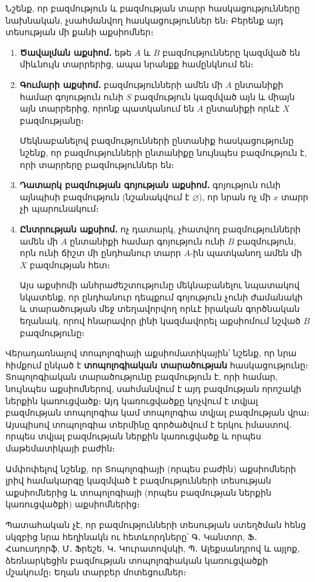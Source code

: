 \documentclass[./main.tex]{subfiles}
\begin{document}
\par Նշենք, որ բազմություն և բազմության տարր հասկացությունները նախնական, չսահմանվող հասկացություններ են։
Բերենք այդ տեսության մի քանի աքսիոմներ։
\begin{enumerate}

\item \textbf{Ծավալման աքսիոմ․} եթե $A$ և $B$ բազմությունները կազմված են միևնույն տարրերից, ապա նրանքք համընկնում են։
\item \textbf{Գումարի աքսիոմ․} բազմությունների ամեն մի $A$ ընտանիքի համար գոյություն ունի $S$ բազմություն կազմված այն և միայն այն տարրերից, որոնք պատկանում են $A$ ընտանիքի որևէ $X$ բազմությանը։\par
Մեկնաբանելով բազմությունների ընտանիք հասկացությունը նշենք, որ բազմությունների ընտանիքը նույնպես բազմություն է, որի տարրերը բազմություններ են։
\item \textbf{Դատարկ բազմության գոյության աքսիոմ․} գոյություն ունի այնպիսի բազմություն (նշանակվում է $\varnothing$), որ նրան ոչ մի $x$ տարր չի պարունակում։

\item \textbf{Ընտրության աքսիոմ․} ոչ դատարկ, չհատվող բազմությունների ամեն մի $A$ ընտանիքի համար գոյություն ունի $B$ բազմություն, որն ունի ճիշտ մի ընդհանուր տարր $A$-ին պատկանող ամեն մի $X$ բազմության հետ։
\par Այս աքսիոմի անհրաժեշտությունը մեկնաբանելու նպատակով նկատենք, որ ընդհանուր դեպքում գոյություն չունի ժամանակի և տարածության մեջ տեղավորվող որևէ իրական գործնական եղանակ, որով հնարավոր լինի կազմավորել աքսիոմում նշված $B$ բազմությունը։
\end{enumerate}
Վերադառնալով տոպոլոգիայի աքսիոմատիկային՝ նշենք, որ նրա հիմքում ընկած է \textbf{տոպոլոգիական տարածության} հասկացությունը։ Տոպոլոգիական տարածությունը բազմություն է, որի համար, նույնպես աքսիոմներով, սահմանվում է այդ բազմության որոշակի ներքին կառուցվածք։ Այդ կառուցվածքը կոչվում է տվյալ բազմության տոպոլոգիա կամ տոպոլոգիա տվյալ բազմության վրա։
Այսպիսով տոպոլոգիա տերմինը գործածվում է երկու իմաստով․ որպես տվյալ բազմության ներքին կառուցվածք և որպես մաթեմատիկայի բաժին։
\par Ամփոփելով նշենք, որ Տոպոլոգիայի (որպես բաժին) աքսիոմների լրիվ համակարգը կազմված է բազմությունների տեսության աքսիոմներից և տոպոլոգիայի (որպես բազմության ներքին կառուցվածքի) աքսիոմներից։
\par Պատահական չէ, որ բազմությունների տեսության ստեղծման հենց սկզբից նրա հեղինակն ու հետևորդները՝ Գ․ Կանտոր, Ֆ․ Հաուսդորֆ, Մ․ Ֆրեշե, Կ․ Կուրատովսկի, Պ․ Ալեքսանդրով և այլոք, ձեռնարկեցին բազմության տոպոլոգիական կառուցվածքի մշակումը։ Եղան տարբեր մոտեցումներ։
\end{document}
